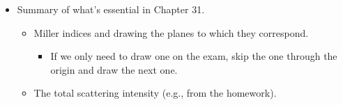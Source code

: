 \documentclass[../notes.tex]{subfiles}
\begin{document}
\begin{itemize}
\begin{itemize}
        \item Mechanism.
        \begin{align*}
            \ce{H2(g) + 2S(s)} &\Longleftrightarrows \ce{2H(ads)}\\[-1.6em]
            \ce{N2(g)} &\Longleftrightarrows \ce{N2(ads)}\\[-1.6em]
            \ce{N2(ads) + 2S(s)} &\Longleftrightarrows \ce{2N(ads)}\\[-1.6em]
            \ce{N(ads) + H(ads)} &\Longleftrightarrows \ce{NH(ads)}\\[-1.6em]
            \ce{NH(ads) + H(ads)} &\Longleftrightarrows \ce{NH2(ads)}\\[-1.6em]
            \ce{NH2(ads) + H(ads)} &\Longleftrightarrows \ce{NH3(ads)}\\[-1.6em]
            \ce{NH3(ads)} &\Longleftrightarrows \ce{NH3(g)}\\[-1.6em]
        \end{align*}
        \begin{itemize}
            \item Splitting nitrogen is the hardest part.
            \item The second step is physisorption.
            \item The third step is dissociative chemisorption.
        \end{itemize}
        \item The relative rates of ammonia synthesis for different transition metal catalysts can be plotted.
        \begin{itemize}
            \item The shape of the plotted data is influenced by the opposing effects of the strength of the surface nitrogen bond and the activation energy of the dissociative chemisorption of .
        \end{itemize}
    \end{itemize}
    \item Summary of what's essential in Chapter 31.
    \begin{itemize}
        \item Miller indices and drawing the planes to which they correspond.
        \begin{itemize}
            \item If we only need to draw one on the exam, skip the one through the origin and draw the next one.
        \end{itemize}
        \item The total scattering intensity (e.g., from the homework).

\end{itemize}
\end{itemize}
\end{document}
